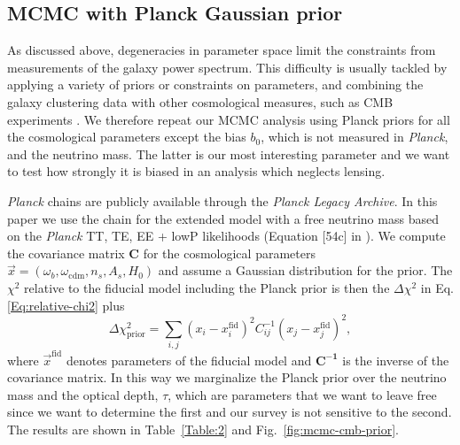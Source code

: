 \subsection{MCMC with Planck Gaussian prior}

As discussed above, degeneracies in parameter space limit the constraints from measurements of the galaxy power spectrum. This difficulty is usually tackled by applying a variety of priors or constraints on parameters, and combining the galaxy clustering data with other cosmological measures, such as CMB experiments \cite{Tegmark:2003ud}. We therefore
repeat our MCMC analysis using Planck priors for all the cosmological parameters except the bias $b_0$, which is not measured in {\it Planck}, and the neutrino mass. The latter is our most interesting parameter and we want to test how strongly it is biased in an analysis which neglects lensing.

{\it Planck} chains are publicly available through the \textit{Planck Legacy Archive}. In this paper we use the chain for the extended model with a free neutrino mass based on the {\it Planck} TT, TE, EE + lowP likelihoods (Equation [54c] in \cite{Ade:2015xua}). We compute the covariance matrix $\mathbf{C}$ for the cosmological parameters $\vec{x}=(\omega_b,\omega_{\mathrm{cdm}},n_s,A_s,H_0)$ and assume a Gaussian distribution for the prior. The $\chi^2$ relative to the fiducial model including the Planck prior is then the $\Delta \chi^2$ in Eq. \eqref{Eq:relative-chi2} plus
\begin{equation}
\Delta \chi^2_{\mathrm{prior}} = \sum_{i,j} (x_i - x^{\mathrm{fid}}_i)^2 C^{-1}_{ij} (x_j - x^{\mathrm{fid}}_j)^2,
\label{Eq:chi2-prior}
\end{equation}
where $\vec{x}^{\mathrm{fid}}$ denotes parameters of the fiducial model and $\mathbf{C^{-1}}$ is the inverse of the covariance matrix. In this way we marginalize the Planck prior over the neutrino mass and the optical depth, $\tau$, which are parameters that we want to leave free since we want to determine the first and our survey is not sensitive to the second. The results are shown in Table~\ref{Table:2} and Fig.~\ref{fig:mcmc-cmb-prior}.

